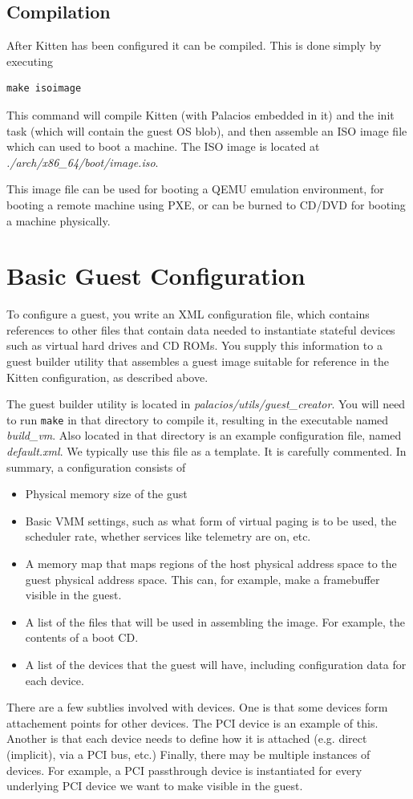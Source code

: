 \documentclass[11pt]{article}
\begin{document}
\subsection{Compilation}

After Kitten has been configured it can be compiled.  This is done
simply by executing
\begin{verbatim}
make isoimage
\end{verbatim}
This command will compile Kitten (with Palacios embedded in it) and
the init task (which will contain the guest OS blob), and then
assemble an ISO image file which can used to boot a machine.  The ISO
image is located at {\em ./arch/x86\_64/boot/image.iso}.  

This image file can be used for booting a QEMU emulation environment,
for booting a remote machine using PXE, or can be burned to CD/DVD for
booting a machine physically. 


\section{Basic Guest Configuration}
\label{sec:guestconfig}

To configure a guest, you write an XML configuration file, which
contains references to other files that contain data needed to
instantiate stateful devices such as virtual hard drives and CD ROMs.
You supply this information to a guest builder utility that assembles
a guest image suitable for reference in the Kitten configuration, as
described above.  

The guest builder utility is located in {\em
palacios/utils/guest\_creator}.  You will need to run \verb.make. in that
directory to compile it, resulting in the executable named {\em
build\_vm}.  Also located in that directory is an example configuration
file, named {\em default.xml}.   We typically use this file as a
template.  It is carefully commented.  In summary, a configuration
consists of
\begin{itemize}
\item Physical memory size of the gust
\item Basic VMM settings, such as what form of virtual paging is to be
used, the scheduler rate, whether services like telemetry are on, etc.
\item A memory map that maps regions of the host physical address
space to the guest physical address space.  This can, for example,
make a framebuffer visible in the guest.
\item A list of the files that will be used in assembling the image.
For example, the contents of a boot CD.
\item A list of the devices that the guest will have, including
configuration data for each device.
\end{itemize}
There are a few subtlies involved with devices.  One is that some
devices form attachement points for other devices.  The PCI device is
an example of this.  Another is that each device needs to define how
it is attached (e.g. direct (implicit), via a PCI bus, etc.)
Finally, there may be multiple instances of devices.   For example, a
PCI passthrough device is instantiated for every underlying PCI device
we want to make visible in the guest. 
\end{document}
